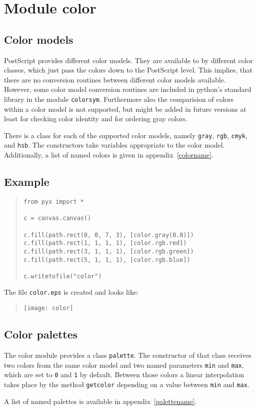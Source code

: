 \chapter{Module color}
\label{color}
\section{Color models}
PostScript provides different color models. They are available to
\PyX{} by different color classes, which just pass the colors down to
the PostScript level. This implies, that there are no conversion
routines between different color models available. However, some color
model conversion routines are included in python's standard library in
the module \texttt{colorsym}. Furthermore also the comparision of
colors within a color model is not supported, but might be added in
future versions at least for checking color identity and for ordering
gray colors.

There is a class for each of the supported color models, namely
\verb|gray|, \verb|rgb|, \verb|cmyk|, and \verb|hsb|. The constructors
take variables appropriate to the color model. Additionally, a list of
named colors is given in appendix~\ref{colorname}.

\section{Example}
\begin{quote}
\begin{verbatim}
from pyx import *

c = canvas.canvas()

c.fill(path.rect(0, 0, 7, 3), [color.gray(0.8)])
c.fill(path.rect(1, 1, 1, 1), [color.rgb.red])
c.fill(path.rect(3, 1, 1, 1), [color.rgb.green])
c.fill(path.rect(5, 1, 1, 1), [color.rgb.blue])

c.writetofile("color")
\end{verbatim}
\end{quote}

The file \verb|color.eps| is created and looks like:
\begin{quote}
\texttt{[image: color]}
\end{quote}

\section{Color palettes}

The color module provides a class \verb|palette|. The constructor of
that class receives two colors from the same color model and two
named parameters \verb|min| and \verb|max|, which are set to \verb|0|
and \verb|1| by default. Between those colors a linear interpolation
takes place by the method \verb|getcolor| depending on a value between
\verb|min| and \verb|max|.

A list of named palettes is available in appendix~\ref{palettename}.

